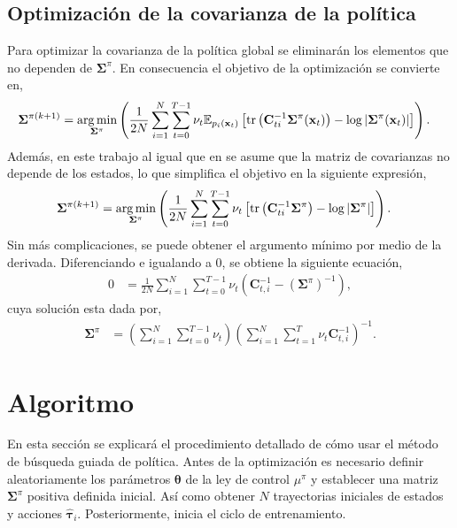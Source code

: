 \subsection{Optimización de la covarianza de la política}
Para optimizar la covarianza de la política global se eliminarán los elementos que no dependen de $\bm\Sigma^{\pi}$. En consecuencia el objetivo de la optimización se convierte en,
\begin{align}
    \bm\Sigma^{\pi (k+1)} &= \operatorname*{arg\,min}_{\bm\Sigma^{\pi}} \left(\frac{1}{2N}\sum_{i=1}^{N}\sum_{t=0}^{T-1} \nu_t \mathbb{E}_{p_i(\mathbf{x}_t)}\left[ \text{tr}\left(\mathbf{C}_{ti}^{-1}\bm\Sigma^{\pi}(\mathbf{x}_t)\right) -\log\left| \bm\Sigma^{\pi}(\mathbf{x}_t)\right|
    \right]\right).
\end{align}
Además, en este trabajo al igual que en \cite{Deep_Visuomotor_Policies} se asume que la matriz de covarianzas no depende de los estados, lo que simplifica el objetivo en la siguiente expresión, 
\begin{align}
    \bm\Sigma^{\pi (k+1)} &= \operatorname*{arg\,min}_{\bm\Sigma^{\pi}} \left(\frac{1}{2N}\sum_{i=1}^{N}\sum_{t=0}^{T-1} \nu_t \left[ \text{tr}\left(\mathbf{C}_{ti}^{-1}\bm\Sigma^{\pi}\right)-\log\left| \bm\Sigma^{\pi}\right|
    \right]\right).
\end{align}
Sin más complicaciones, se puede obtener el argumento mínimo por medio de la derivada. Diferenciando e igualando a 0, se obtiene la siguiente ecuación, 
\begin{align}
    0 &= \frac{1}{2N}\sum_{i=1}^{N}\sum_{t=0}^{T-1}
    \nu_t\left(\mathbf{C}_{t,i}^{-1} - \left(\bm\Sigma^{\pi}\right)^{-1}\right),
\end{align}
cuya solución esta dada por, 
\begin{align}
    \bm\Sigma^{\pi} &= \left(\sum_{i=1}^{N}\sum_{t=0}^{T-1}\nu_t\right)
    \left(
    \sum_{i=1}^{N}\sum_{t=1}^{T} \nu_t \mathbf{C}_{t,i}^{-1}
    \right)^{-1}.
    \label{eq:policy_sigma}
\end{align}

\section{Algoritmo}
En esta sección se explicará el procedimiento detallado de cómo usar el método de búsqueda guiada de política. Antes de la optimización es necesario definir aleatoriamente los parámetros $\bm\theta$ de la ley de control $\mu^{\pi}$ y establecer una matriz $\bm\Sigma^{\pi}$ positiva definida inicial. Así como obtener $N$ trayectorias iniciales de estados y acciones $\hat{\bm\tau}_i$. Posteriormente, inicia el ciclo de entrenamiento.

